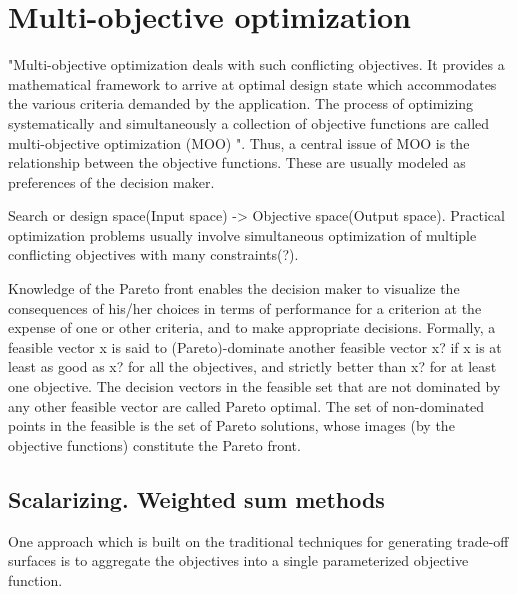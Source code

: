     
    \section{Multi-objective optimization}
        "Multi-objective optimization deals with such conflicting objectives. It provides a
        mathematical framework to arrive at optimal design state which accommodates the various criteria demanded by
        the application. The process of optimizing systematically and simultaneously a collection of objective functions
        are called multi-objective optimization (MOO) \cite{odugod2013}".
        Thus, a central issue of MOO is the relationship between the objective functions. These are usually modeled as preferences of the decision maker.

        Search or design space(Input space) -> Objective space(Output space).
        Practical optimization problems usually involve simultaneous optimization of multiple conflicting objectives with many constraints(?).

        Knowledge of the Pareto front enables the decision maker to visualize the consequences of his/her choices in terms of performance 
        for a criterion at the expense of one or other criteria, and to make appropriate decisions. Formally, a feasible vector x is said to (Pareto)-dominate another feasible vector x? if
        x is at least as good as x? for all the objectives, and strictly better than x? for at least one objective. The decision vectors in the feasible set 
        that are not dominated by any other feasible vector are called Pareto optimal. The set of non-dominated points in the 
        feasible is the set of Pareto solutions, whose images (by the objective functions) constitute the Pareto front.\cite{Audet2018PerformanceII}


        \subsection{Scalarizing. Weighted sum methods}

            One approach which is built on the traditional techniques for generating trade-off surfaces is to aggregate the objectives into a single parameterized objective function.

